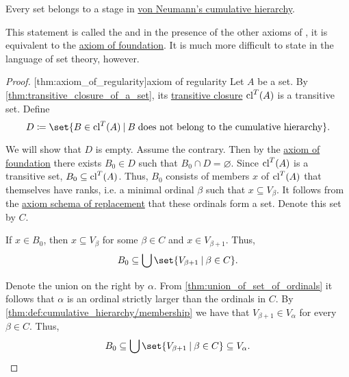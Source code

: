 \begin{theorem}\label{thm:axiom_of_regularity}
  Every set belongs to a stage in \hyperref[def:cumulative_hierarchy]{von Neumann's cumulative hierarchy}.
\end{theorem}
\begin{comments}
  \item This statement is called the  and in the presence of the other axioms of , it is equivalent to the \hyperref[def:zfc/foundation]{axiom of foundation}. It is much more difficult to state in the language of set theory, however.
\end{comments}
\begin{proof}
  [thm:axiom_of_regularity]{axiom of regularity} Let \( A \) be a set. By \cref{thm:transitive_closure_of_a_set}, its \hyperref[def:transitive_closure_of_a_set]{transitive closure} \( \operatorname{cl}^T(A) \) is a transitive set. Define
  \begin{equation*}
    D \coloneqq \set{ B \in \cl^T(A) \given B \T{does not belong to the cumulative hierarchy} }.
  \end{equation*}

  We will show that \( D \) is empty. Assume the contrary. Then by the \hyperref[def:zfc/foundation]{axiom of foundation} there exists \( B_0 \in D \) such that \( B_0 \cap D = \varnothing \). Since \( \operatorname{cl}^T(A) \) is a transitive set, \( B_0 \subseteq \operatorname{cl}^T(A) \). Thus, \( B_0 \) consists of members \( x \) of \( \operatorname{cl}^T(A) \) that themselves have ranks, i.e. a minimal ordinal \( \beta \) such that \( x \subseteq V_\beta \). It follows from the \hyperref[def:zfc/replacement]{axiom schema of replacement} that these ordinals form a set. Denote this set by \( C \).

  If \( x \in B_0 \), then \( x \subseteq V_\beta \) for some \( \beta \in C \) and \( x \in V_{\beta + 1} \). Thus,
  \begin{equation*}
    B_0 \subseteq \bigcup\set{ V_{\beta + 1} \given \beta \in C }.
  \end{equation*}

  Denote the union on the right by \( \alpha \). From \cref{thm:union_of_set_of_ordinals} it follows that \( \alpha \) is an ordinal strictly larger than the ordinals in \( C \). By \cref{thm:def:cumulative_hierarchy/membership} we have that \( V_{\beta + 1} \in V_\alpha \) for every \( \beta \in C \). Thus,
  \begin{equation*}
    B_0 \subseteq \bigcup\set{ V_{\beta + 1} \given \beta \in C } \subseteq V_\alpha.
  \end{equation*}


\end{proof}
